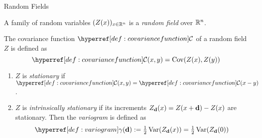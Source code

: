 \begin{frame}{Random Fields}
	\begin{definition}
		A family of random variables \((Z(x))_{x\in\mathbb{R}^n}\) is a
		\emph{random field} over \(\mathbb{R}^n\).
	\end{definition}
	\begin{definition}\label{def: covariance function}
		The covariance function \(\C\) of a random field \(Z\) is defined as
		\[
			\C(x,y) = \Cov(Z(x),Z(y))	
		\]
		\vspace*{-0.5cm}	
		\begin{enumerate}
			\item \(Z\) is \emph{stationary} if \(\C(x,y) = \C(x-y)\).
			\item \(Z\) is \emph{intrinsically stationary} if its increments
			\(Z_{\mathbf{d}}(x) = Z(x+\mathbf{d}) - Z(x)\) are stationary. Then the
			\emph{variogram} is defined as
			\begin{equation*}\label{def: variogram}
				\variogram(\step) := \tfrac12\Var(Z_\step(x)) = \tfrac12\Var(Z_\step(0))
			\end{equation*}
		\end{enumerate}
	\end{definition}
\end{frame}